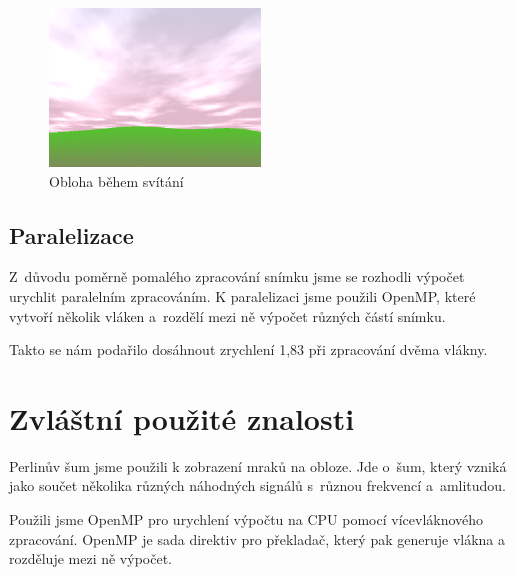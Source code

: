 \documentclass[12pt,a4paper,titlepage,final]{report}
\begin{document}
\begin{figure}[h] \centering
        \includegraphics[width=0.5\textwidth]{images/sky2.png}
    \caption{Obloha během svítání} \label{fig:sky_dawn}
\end{figure}


\section{Paralelizace}

Z~důvodu poměrně pomalého zpracování snímku jsme se rozhodli výpočet
urychlit paralelním zpracováním. K paralelizaci jsme použili OpenMP,
které vytvoří několik vláken a~rozdělí mezi ně výpočet různých
částí snímku.

Takto se nám podařilo dosáhnout zrychlení 1,83 při zpracování dvěma
vlákny.

\chapter{Zvláštní použité znalosti}


Perlinův šum\cite{cite1, cite2} jsme použili k zobrazení mraků na obloze. Jde
o~šum, který vzniká jako součet několika různých náhodných signálů s~různou
frekvencí a~amlitudou.

Použili jsme OpenMP pro urychlení výpočtu na CPU pomocí vícevláknového
zpracování. OpenMP je sada direktiv pro překladač, který pak generuje vlákna
a rozděluje mezi ně výpočet.

\end{document}
